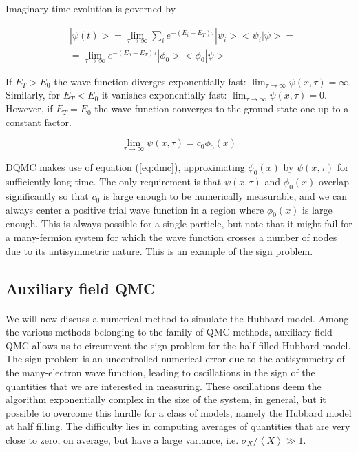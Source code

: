 \documentclass[10pt, twocolumn, twoside]{article}
\begin{document}
Imaginary time evolution is governed by

\begin{equation}\label{eq:im_ev}
\begin{split}
&| \psi (t) > = \lim_{\tau \rightarrow \infty} \sum_i e^{-(E_i - E_T) \tau} |\psi_i > <\psi_i | \psi > = \\
&= \lim_{\tau \rightarrow \infty} e^{-(E_0 - E_T)\tau} | \phi_0 >< \phi_0 | \psi > 
\end{split}
\end{equation}


If $E_T > E_0$ the wave function diverges exponentially fast: $\lim_{\tau \rightarrow \infty} \psi ( x, \tau) = \infty$. Similarly, for $E_T < E_0$ it vanishes exponentially fast: $
\lim_{\tau \rightarrow \infty} \psi ( x, \tau) = 0$. However, if $E_T = E_0$ the wave function converges to the ground state one up to a constant factor.

\begin{equation}\label{eq:dmc}
\lim_{\tau \rightarrow \infty} \psi ( x, \tau) = c_0 \phi_0 (x)
\end{equation}

DQMC makes use of equation (\ref{eq:dmc}), approximating $\phi_0(x)$ by $\psi (x, \tau)$ for sufficiently long time. The only requirement is that $\psi (x, \tau)$ and $\phi_0(x)$ overlap significantly so that $c_0$ is large enough to be numerically measurable, and we can always center a positive trial wave function in a region where $\phi_0(x)$ is large enough. This is always possible for a single particle,  but note that it might fail for a many-fermion system for which the wave function crosses a number of nodes due to its antisymmetric nature. This is an example of the sign problem.\par


\subsection{Auxiliary field QMC}\paragraph{}

We will now discuss a numerical method to simulate the Hubbard model. Among the various methods belonging to the family of QMC methods, auxiliary field QMC allows us to circumvent the sign problem for the half filled Hubbard model. The sign problem is an uncontrolled numerical error due to the antisymmetry of the many-electron wave function, leading to oscillations in the sign of the quantities that we are interested in measuring. These oscillations deem the algorithm exponentially complex in the size of the system, in general, but it possible to overcome this hurdle for a class of models, namely the Hubbard model at half filling. The difficulty lies in computing averages of quantities that are very close to zero, on average, but have a large variance, i.e. $\sigma_X / \left\langle X \right\rangle \gg 1$.
\end{document}
